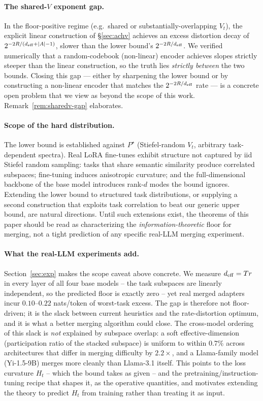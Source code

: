 \paragraph{The shared-$V$ exponent gap.} In the floor-positive
regime (e.g.\ shared or substantially-overlapping $V_t$), the
explicit linear construction of \S\ref{sec:achv} achieves an
excess distortion decay of $2^{-2R/(d_{\mathrm{eff}}+|A|-1)}$, slower than
the lower bound's $2^{-2R/d_{\mathrm{eff}}}$. We verified numerically that
a random-codebook (non-linear) encoder achieves slopes strictly
steeper than the linear construction, so the truth lies
\emph{strictly between} the two bounds. Closing this gap — either
by sharpening the lower bound or by constructing a non-linear
encoder that matches the $2^{-2R/d_{\mathrm{eff}}}$ rate — is a concrete
open problem that we view as beyond the scope of this work.
Remark~\ref{rem:sharedv-gap} elaborates.

\paragraph{Scope of the hard distribution.} The lower bound is
established against $P^\star$ (Stiefel-random $V_t$, arbitrary
task-dependent spectra). Real LoRA fine-tunes exhibit structure
not captured by iid Stiefel random sampling: tasks that share
semantic similarity produce correlated subspaces; fine-tuning
induces anisotropic curvature; and the full-dimensional backbone
of the base model introduces rank-$d$ modes the bound ignores.
Extending the lower bound to structured task distributions, or
supplying a second construction that exploits task correlation
to beat our generic upper bound, are natural directions. Until
such extensions exist, the theorems of this paper should be read
as characterizing the \emph{information-theoretic} floor for
merging, not a tight prediction of any specific real-LLM merging
experiment.

\paragraph{What the real-LLM experiments add.} Section~\ref{sec:exp}
makes the scope caveat above concrete. We measure $d_{\mathrm{eff}} = Tr$ in
every layer of all four base models -- the task subspaces are
linearly independent, so the predicted floor is exactly zero --
yet real merged adapters incur $0.10$--$0.22$ nats/token of
worst-task excess. The gap is therefore not floor-driven; it is
the slack between current heuristics and the rate-distortion
optimum, and it is what a better merging algorithm could close.
The cross-model ordering of this slack is \emph{not} explained by
subspace overlap: a soft effective-dimension (participation ratio
of the stacked subspace) is uniform to within $0.7\%$ across
architectures that differ in merging difficulty by $2.2\times$,
and a Llama-family model (Yi-1.5-9B) merges more cleanly than
Llama-3.1 itself. This points to the loss curvature $H_t$ -- which
the bound takes as given -- and the pretraining/instruction-tuning
recipe that shapes it, as the operative quantities, and motivates
extending the theory to predict $H_t$ from training rather than
treating it as input.

